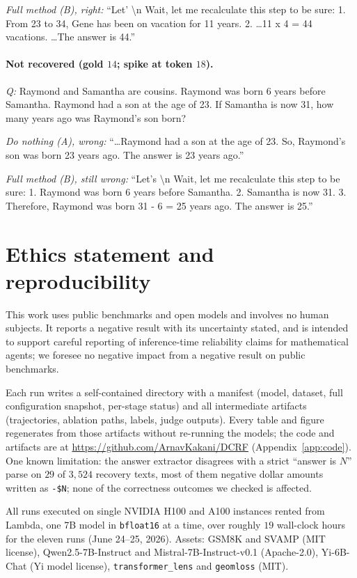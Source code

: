 \documentclass{article}
\begin{document}
\emph{Full method (B), right:} ``Let' \textbackslash n Wait, let me recalculate this step to be sure: 1. From 23 to 34, Gene has been on vacation for 11 years. 2. \ldots 11 x 4 = 44 vacations. \ldots The answer is 44.''

\paragraph{Not recovered (gold $14$; spike at token $18$).}
\emph{Q:} Raymond and Samantha are cousins. Raymond was born 6 years before Samantha. Raymond had a son at the age of 23. If Samantha is now 31, how many years ago was Raymond's son born?

\emph{Do nothing (A), wrong:} ``\ldots Raymond had a son at the age of 23. So, Raymond's son was born 23 years ago. The answer is 23 years ago.''

\emph{Full method (B), still wrong:} ``Let's \textbackslash n Wait, let me recalculate this step to be sure: 1. Raymond was born 6 years before Samantha. 2. Samantha is now 31. 3. Therefore, Raymond was born 31 - 6 = 25 years ago. The answer is 25.''

\section{Ethics statement and reproducibility}
\label{app:ethics}
This work uses public benchmarks and open models and involves no human subjects. It reports a negative result with its uncertainty stated, and is intended to support careful reporting of inference-time reliability claims for mathematical agents; we foresee no negative impact from a negative result on public benchmarks.

Each run writes a self-contained directory with a manifest (model, dataset, full configuration snapshot, per-stage status) and all intermediate artifacts (trajectories, ablation paths, labels, judge outputs). Every table and figure regenerates from those artifacts without re-running the models; the code and artifacts are at \url{https://github.com/ArnavKakani/DCRF} (Appendix~\ref{app:code}). One known limitation: the answer extractor disagrees with a strict ``answer is $N$'' parse on $29$ of $3{,}524$ recovery texts, most of them negative dollar amounts written as \texttt{-\$N}; none of the correctness outcomes we checked is affected.

All runs executed on single NVIDIA H100 and A100 instances rented from Lambda, one 7B model in \texttt{bfloat16} at a time, over roughly $19$ wall-clock hours for the eleven runs (June 24--25, 2026). Assets: GSM8K and SVAMP (MIT license), Qwen2.5-7B-Instruct and Mistral-7B-Instruct-v0.1 (Apache-2.0), Yi-6B-Chat (Yi model license), \texttt{transformer\_lens} and \texttt{geomloss} (MIT).

\clearpage

\end{document}
